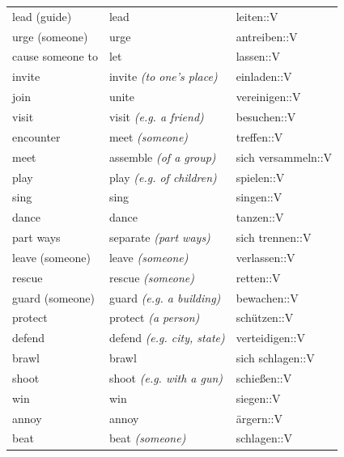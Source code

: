 \begin{center}
\begin{longtable}{lll}
{\sc \lowercase{	LEAD \footnotesize (GUIDE)	}}	&	lead		&	leiten::V	\\
{\sc \lowercase{	URGE \footnotesize (SOMEONE)	}}	&	urge		&	antreiben::V	\\
{\sc \lowercase{	CAUSE SOMEONE TO	}}	&	let		&	lassen::V	\\
{\sc \lowercase{	INVITE	}}	&	invite	\textit{\footnotesize (to one's place)}	&	einladen::V	\\
{\sc \lowercase{	JOIN	}}	&	unite		&	vereinigen::V	\\
{\sc \lowercase{	VISIT	}}	&	visit	\textit{\footnotesize (e.g. a friend)}	&	besuchen::V	\\
{\sc \lowercase{	ENCOUNTER	}}	&	meet	\textit{\footnotesize (someone)}	&	treffen::V	\\
{\sc \lowercase{	MEET	}}	&	assemble	\textit{\footnotesize (of a group)}	&	sich versammeln::V	\\
{\sc \lowercase{	PLAY	}}	&	play	\textit{\footnotesize (e.g. of children)}	&	spielen::V	\\
{\sc \lowercase{	SING	}}	&	sing		&	singen::V	\\
{\sc \lowercase{	DANCE	}}	&	dance		&	tanzen::V	\\
{\sc \lowercase{	PART WAYS	}}	&	separate	\textit{\footnotesize (part ways)}	&	sich trennen::V	\\
{\sc \lowercase{	LEAVE \footnotesize (SOMEONE)	}}	&	leave	\textit{\footnotesize (someone)}	&	verlassen::V	\\
{\sc \lowercase{	RESCUE	}}	&	rescue	\textit{\footnotesize (someone)}	&	retten::V	\\
{\sc \lowercase{	GUARD \footnotesize (SOMEONE)	}}	&	guard	\textit{\footnotesize (e.g. a building)}	&	bewachen::V	\\
{\sc \lowercase{	PROTECT	}}	&	protect	\textit{\footnotesize (a person)}	&	schützen::V	\\
{\sc \lowercase{	DEFEND	}}	&	defend	\textit{\footnotesize (e.g. city, state)}	&	verteidigen::V	\\
{\sc \lowercase{	BRAWL	}}	&	brawl		&	sich schlagen::V	\\
{\sc \lowercase{	SHOOT	}}	&	shoot	\textit{\footnotesize (e.g. with a gun)}	&	schießen::V	\\
{\sc \lowercase{	WIN	}}	&	win		&	siegen::V	\\
{\sc \lowercase{	ANNOY	}}	&	annoy		&	ärgern::V	\\
{\sc \lowercase{	BEAT	}}	&	beat	\textit{\footnotesize (someone)}	&	schlagen::V	\\

\end{longtable}
\end{center}
